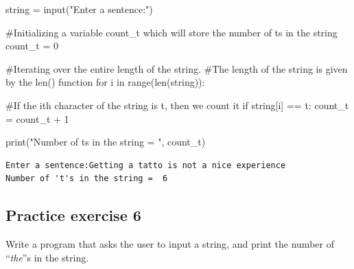 \documentclass[
  letterpaper,
  DIV=11,
  numbers=noendperiod]{scrreprt}
\newenvironment{Shaded}{\begin{snugshade}}{\end{snugshade}}
\newcommand{\BuiltInTok}[1]{\textcolor[rgb]{0.00,0.23,0.31}{#1}}
\newcommand{\CommentTok}[1]{\textcolor[rgb]{0.37,0.37,0.37}{#1}}
\newcommand{\ControlFlowTok}[1]{\textcolor[rgb]{0.00,0.23,0.31}{#1}}
\newcommand{\DecValTok}[1]{\textcolor[rgb]{0.68,0.00,0.00}{#1}}
\newcommand{\KeywordTok}[1]{\textcolor[rgb]{0.00,0.23,0.31}{#1}}
\newcommand{\NormalTok}[1]{\textcolor[rgb]{0.00,0.23,0.31}{#1}}
\newcommand{\OperatorTok}[1]{\textcolor[rgb]{0.37,0.37,0.37}{#1}}
\newcommand{\StringTok}[1]{\textcolor[rgb]{0.13,0.47,0.30}{#1}}
\begin{document}
\begin{Shaded}
\begin{Highlighting}[]
\NormalTok{string }\OperatorTok{=} \BuiltInTok{input}\NormalTok{(}\StringTok{"Enter a sentence:"}\NormalTok{)}

\CommentTok{\#Initializing a variable \textquotesingle{}count\_t\textquotesingle{} which will store the number of \textquotesingle{}t\textquotesingle{}s in the string}
\NormalTok{count\_t }\OperatorTok{=} \DecValTok{0}

\CommentTok{\#Iterating over the entire length of the string. }
\CommentTok{\#The length of the string is given by the len() function}
\ControlFlowTok{for}\NormalTok{ i }\KeywordTok{in} \BuiltInTok{range}\NormalTok{(}\BuiltInTok{len}\NormalTok{(string)):}
    
    \CommentTok{\#If the ith character of the string is \textquotesingle{}t\textquotesingle{}, then we count it}
    \ControlFlowTok{if}\NormalTok{ string[i] }\OperatorTok{==} \StringTok{\textquotesingle{}t\textquotesingle{}}\NormalTok{:}
\NormalTok{        count\_t }\OperatorTok{=}\NormalTok{ count\_t }\OperatorTok{+} \DecValTok{1}

\BuiltInTok{print}\NormalTok{(}\StringTok{"Number of \textquotesingle{}t\textquotesingle{}s in the string = "}\NormalTok{, count\_t)}
\end{Highlighting}
\end{Shaded}

\begin{verbatim}
Enter a sentence:Getting a tatto is not a nice experience
Number of 't's in the string =  6
\end{verbatim}

\hypertarget{practice-exercise-6-1}{%
\subsection{Practice exercise 6}\label{practice-exercise-6-1}}

Write a program that asks the user to input a string, and print the
number of ``\emph{the}''s in the string.
\end{document}
